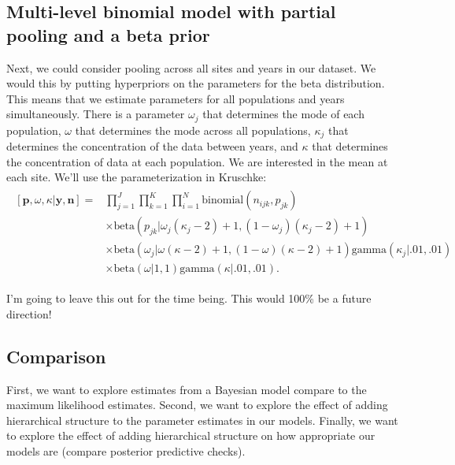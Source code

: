 \documentclass[12pt, oneside, titlepage]{article}   	%
\begin{document}
\subsection*{Multi-level binomial model with partial pooling and a beta prior}

Next, we could consider pooling across all sites and years in our dataset. We would this by putting hyperpriors on the parameters for the beta distribution. This means that we estimate parameters for all populations and years simultaneously. There is a parameter $\omega_j$ that determines the mode of each population, $\omega$ that determines the mode across all populations, $\kappa_j$ that determines the concentration of the data between years, and $\kappa$ that determines the concentration of data at each population. We are interested in the mean at each site. We'll use the parameterization in Kruschke:
%
\begin{align}
  \begin{split}
[\bm{p},\omega,\kappa|\bm{y},\bm{n}]  = & \prod_{j=1}^J \prod_{k=1}^K \prod_{i=1}^N \mathrm{binomial}(n_{ijk},p_{jk}) 
    \\ & \times \mathrm{beta} (  p_{jk} | \omega_j(\kappa_j-2) +1 , (1-\omega_j) (\kappa_j -2) + 1) 
    \\ & \times \mathrm{beta} ( \omega_j |  \omega(\kappa-2) +1 , (1-\omega) (\kappa -2) + 1) \mathrm{gamma} ( \kappa_j | .01, .01) 
    \\ & \times \mathrm{beta} ( \omega | 1 , 1 )  \mathrm{gamma} ( \kappa | .01, .01)  .
  \end{split}
\end{align}

I'm going to leave this out for the time being. This would 100\% be a future direction!
\fi



\subsection*{Comparison}

First, we want to explore estimates from a Bayesian model compare to the maximum likelihood estimates. Second, we want to explore the effect of adding hierarchical structure to the parameter estimates in our models. Finally, we want to explore the effect of adding hierarchical structure on how appropriate our models are (compare posterior predictive checks).
\end{document}
